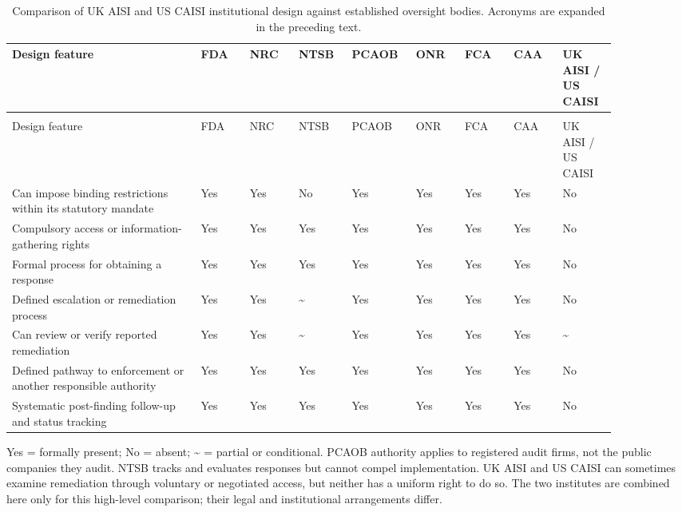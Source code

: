 \documentclass{article}
\begin{document}
\clearpage
\begingroup
\small
\setlength{\tabcolsep}{2pt}
\renewcommand{\arraystretch}{1.08}
\begin{longtable}{>{\raggedright\arraybackslash}p{0.270\linewidth} >{\raggedright\arraybackslash}p{0.076\linewidth} >{\raggedright\arraybackslash}p{0.076\linewidth} >{\raggedright\arraybackslash}p{0.076\linewidth} >{\raggedright\arraybackslash}p{0.076\linewidth} >{\raggedright\arraybackslash}p{0.076\linewidth} >{\raggedright\arraybackslash}p{0.076\linewidth} >{\raggedright\arraybackslash}p{0.076\linewidth} >{\raggedright\arraybackslash}p{0.076\linewidth}}
\caption{Comparison of UK AISI and US CAISI institutional design against established oversight bodies. Acronyms are expanded in the preceding text.}\label{tab:institutional-comparison}\\
\toprule
Design feature & FDA & NRC & NTSB & PCAOB & ONR & FCA & CAA & UK AISI / US CAISI \\
\midrule
\endfirsthead
\multicolumn{9}{r}{\small Table \thetable\ (continued)} \\
\toprule
Design feature & FDA & NRC & NTSB & PCAOB & ONR & FCA & CAA & UK AISI / US CAISI \\
\midrule
\endhead
Can impose binding restrictions within its statutory mandate & Yes & Yes & No & Yes & Yes & Yes & Yes & No \\
Compulsory access or information-gathering rights & Yes & Yes & Yes & Yes & Yes & Yes & Yes & No \\
Formal process for obtaining a response & Yes & Yes & Yes & Yes & Yes & Yes & Yes & No \\
Defined escalation or remediation process & Yes & Yes & \textasciitilde{} & Yes & Yes & Yes & Yes & No \\
Can review or verify reported remediation & Yes & Yes & \textasciitilde{} & Yes & Yes & Yes & Yes & \textasciitilde{} \\
Defined pathway to enforcement or another responsible authority & Yes & Yes & Yes & Yes & Yes & Yes & Yes & No \\
Systematic post-finding follow-up and status tracking & Yes & Yes & Yes & Yes & Yes & Yes & Yes & No \\
\bottomrule
\end{longtable}
\endgroup
Yes = formally present; No = absent; \textasciitilde{} = partial or conditional. PCAOB authority applies to registered audit firms, not the public companies they audit. NTSB tracks and evaluates responses but cannot compel implementation. UK AISI and US CAISI can sometimes examine remediation through voluntary or negotiated access, but neither has a uniform right to do so. The two institutes are combined here only for this high-level comparison; their legal and institutional arrangements differ. 
\end{document}
